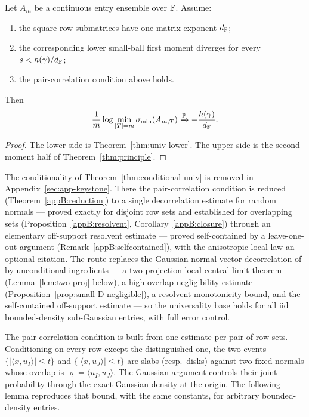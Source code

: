 \begin{theorem}\label{thm:conditional-univ}
Let \(A_m\) be a continuous entry ensemble over \(\mathbb{F}\).  Assume:
\begin{enumerate}
\item the square row submatrices have one-matrix exponent \(d_{\mathbb{F}}\);
\item the corresponding lower small-ball first moment diverges for every
      \(s<h(\gamma)/d_{\mathbb{F}}\);
\item the pair-correlation condition above holds.
\end{enumerate}
Then
\[
  \frac{1}{m}\log\min_{|T|=m}\sigma_{\min}(A_{m,T})
  \xrightarrow{\mathbb{P}}-\frac{h(\gamma)}{d_{\mathbb{F}}}.
\]
\end{theorem}

\begin{proof}
The lower side is Theorem~\ref{thm:univ-lower}.  The upper side is the
second-moment half of Theorem~\ref{thm:principle}.
\end{proof}

\begin{remark}
The conditionality of Theorem~\ref{thm:conditional-univ} is removed in
Appendix~\ref{sec:app-keystone}.  There the pair-correlation condition is reduced
(Theorem~\ref{appB:reduction}) to a single decorrelation estimate for random
normals --- proved exactly for disjoint row sets and established for overlapping
sets (Proposition~\ref{appB:resolvent}, Corollary~\ref{appB:closure}) through an
elementary off-support resolvent estimate --- proved self-contained by a
leave-one-out argument (Remark~\ref{appB:selfcontained}), with the anisotropic local
law \cite{KnowlesYin2017,BEKYY2014} an optional citation.  The route replaces the
Gaussian normal-vector decorrelation of \cite{ShmaloExtremal2026} by unconditional
ingredients --- a two-projection local central limit theorem
(Lemma~\ref{lem:two-proj} below), a high-overlap negligibility estimate
(Proposition~\ref{prop:small-D-negligible}), a resolvent-monotonicity bound, and the
self-contained off-support estimate --- so the universality base holds for all iid
bounded-density sub-Gaussian entries, with full error control.
\end{remark}

The pair-correlation condition is built from one estimate per pair of row sets.
Conditioning on every row except the distinguished one, the two events
$\{|\langle x,u_I\rangle|\le t\}$ and $\{|\langle x,u_J\rangle|\le t\}$ are slabs
(resp.\ disks) against two fixed normals whose overlap is $\varrho=\langle
u_I,u_J\rangle$.  The Gaussian argument controls their joint probability through
the exact Gaussian density at the origin.  The following lemma reproduces that
bound, with the same constants, for arbitrary bounded-density entries.


